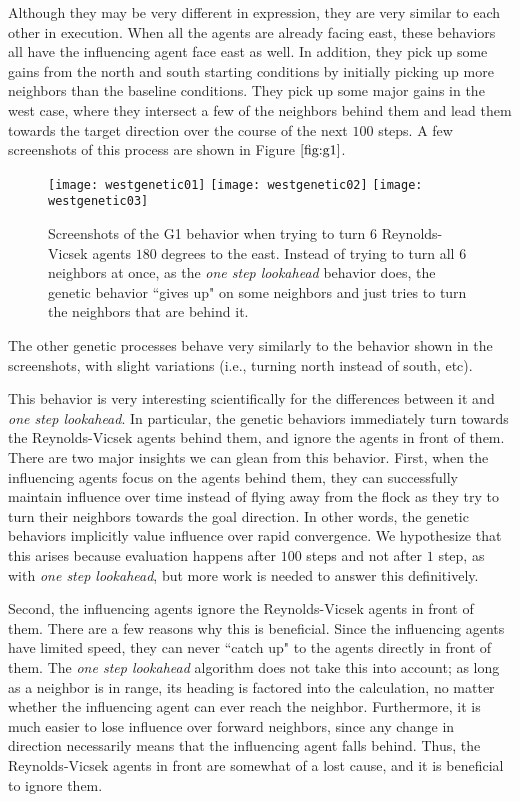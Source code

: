 Although they may be very different in expression, they are very similar to each
other in execution.
When all the agents are already facing east, these behaviors all have the
influencing agent face east as well.
In addition, they pick up some gains from the north and south starting conditions
by initially picking up more neighbors than the baseline conditions.
They pick up some major gains in the west case, where they intersect a few of
the neighbors behind them and lead them towards the target direction over the
course of the next $100$ steps.
A few screenshots of this process are shown in Figure $\ref{fig:g1}$.
\begin{figure}
    \centering
    \texttt{[image: westgenetic01]}
    \texttt{[image: westgenetic02]}
    \texttt{[image: westgenetic03]}
    \caption{Screenshots of the G1 behavior when trying to turn $6$
    Reynolds-Vicsek agents $180$ degrees to the east.
    Instead of trying to turn all $6$ neighbors at once, as the \textit{one step
    lookahead} behavior does, the genetic behavior ``gives up" on some neighbors
    and just tries to turn the neighbors that are behind it.}
    \label{fig:g1}
\end{figure}
The other genetic processes behave very similarly to the behavior shown in the
screenshots, with slight variations (i.e., turning north instead of south, etc).

This behavior is very interesting scientifically for the differences between it
and \textit{one step lookahead}.
In particular, the genetic behaviors immediately turn towards the Reynolds-Vicsek
agents behind them, and ignore the agents in front of them.
There are two major insights we can glean from this behavior.
First, when the influencing agents focus on the agents behind them, they can
successfully maintain influence over time instead of flying away from the flock
as they try to turn their neighbors towards the goal direction.
In other words, the genetic behaviors implicitly value influence over rapid
convergence.
We hypothesize that this arises because evaluation happens after $100$ steps and
not after $1$ step, as with \textit{one step lookahead}, but more work is
needed to answer this definitively.

Second, the influencing agents ignore the Reynolds-Vicsek agents in front of
them.
There are a few reasons why this is beneficial.
Since the influencing agents have limited speed, they can never ``catch
up" to the agents directly in front of them.
The \textit{one step lookahead} algorithm does not take this into account;
as long as a neighbor is in range, its heading is factored into the calculation,
no matter whether the influencing agent can ever reach the neighbor.
Furthermore, it is much easier to lose influence over forward neighbors, since
any change in direction necessarily means that the influencing agent falls
behind.
Thus, the Reynolds-Vicsek agents in front are somewhat of a lost cause, and it
is beneficial to ignore them.

